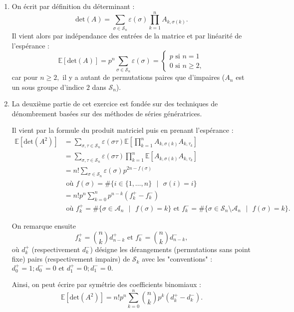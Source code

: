 \begin{enumerate}
\item On écrit par d\'{e}finition du déterminant :
$$\mbox{det}(A) = \sum_{\sigma\in \mathcal{S}_{n}}\varepsilon(\sigma)\prod_{k=1}^{n}A_{k,\sigma(k)}.$$
Il vient alors par indépendance des entrées de la matrice et par linéarité de l'espérance :
$$\mathbb{E}[\mbox{det}(A)]= p^{n}\sum_{\sigma\in\mathcal{S}_{n}}\varepsilon(\sigma)=\left\{ \begin{array}{l}
p \mbox{ si } n=1\\
0 \mbox{ si } n\geq 2,
\end{array}\right.$$
car pour $n\geq 2,$ il y a autant de permutations paires que d'impaires ($A_{n}$ est un sous groupe d'indice $2$ dans $\mathcal{S}_{n}$).\\

\item La deuxième partie de cet exercice est fondée sur des techniques de dénombrement basées sur des méthodes de séries génératrices. 

Il vient par la formule du produit matriciel puis en prenant l'espérance :
\begin{align*}
\mathbb{E}[\mbox{det}(A^{2})] & = \sum_{\sigma,\tau\in \mathcal{S}_{n}}\varepsilon(\sigma\tau)\mathbb{E}[\prod_{k=1}^{n}A_{k,\sigma(k)}A_{k,\tau_{k}}]\\
& =\sum_{\sigma,\tau\in \mathcal{S}_{n}}\varepsilon(\sigma\tau)\prod_{k=1}^{n}\mathbb{E}[A_{k,\sigma(k)}A_{k,\tau_{k}}]\\
& = n!\sum_{\sigma\in \mathcal{S}_{n}}\varepsilon(\sigma)p^{2n-f(\sigma)}\\
& \mbox{ où } f(\sigma)=\#\{i\in\{1,\ldots,n\}\mbox{ }|\mbox{ } \sigma(i)=i\}\\
&  = n!p^{n}\sum_{k=0}^{n}p^{n-k}\left(f_{k}^{+}-f_{k}^{-}\right)\\
& \mbox{ où } f_{k}^{+}=\#\{\sigma\in \mathcal{A}_{n}\mbox{ }|\mbox{ } f(\sigma)=k\} \mbox{ et } f_{k}^{-}=\#\{\sigma\in \mathcal{S}_{n}\setminus{\mathcal{A}_{n}}\mbox{ }|\mbox{ } f(\sigma)=k\}.
\end{align*}

On remarque ensuite $$f_{k}^{+}=\binom{n}{k}d_{n-k}^{+} \mbox{ et } f_{k}^{-}=\binom{n}{k}d_{n-k}^{-},$$ où $d_{k}^{+}$ (respectivement $d_{k}^{-}$) désigne les dérangements (permutations sans point fixe) pairs (respectivement impairs) de $\mathcal{S}_{k}$ avec les "conventions" : $\displaystyle d_{0}^{+}=1;d_{0}^{-}=0 \mbox{ et } d_{1}^{+}=0;d_{1}^{-}=0.$ 

Ainsi, on peut écrire par symétrie des coefficients binomiaux : $$\mathbb{E}[\mbox{det}(A^{2})] =  n!p^{n}\sum_{k=0}^{n}\binom{n}{k}p^{k}\left(d_{k}^{+}-d_{k}^{-}\right).$$


\end{enumerate}
